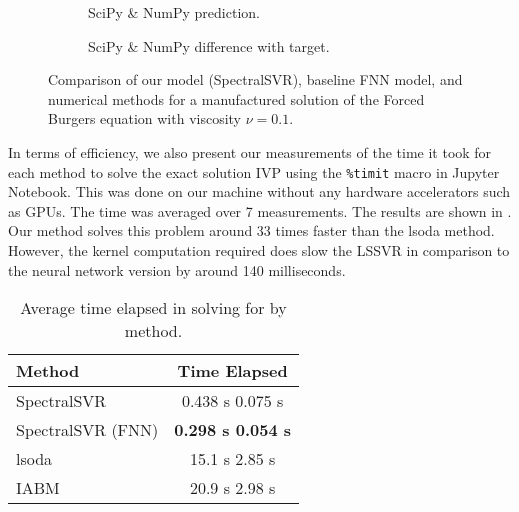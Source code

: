 \documentclass[preprint,12pt,times,authoryear]{elsarticle}
\begin{document}
\begin{figure}[H]
\begin{adjustwidth}{-0.05\linewidth}{-0.05\linewidth}
\begin{subfigure}{0.49\linewidth}
      \begin{adjustbox}{width=\linewidth}
        
      \end{adjustbox}
      \caption{SciPy \& NumPy prediction.}\label{fig:comp_spo_pred_0.1}
    \end{subfigure}
    \begin{subfigure}{0.49\linewidth}
      \begin{adjustbox}{width=\linewidth}
        
      \end{adjustbox}
      \caption{SciPy \& NumPy difference with target.}\label{fig:comp_spo_diff_0.1}
    \end{subfigure}
  \end{adjustwidth}
  \caption{Comparison of our model (SpectralSVR), baseline FNN model, and numerical methods for a manufactured solution of the Forced Burgers equation with viscosity \(\nu=0.1\).}\label{fig:comparison_burgers_0.1}
\end{figure}

In terms of efficiency, we also present our measurements of the time it took for each method to solve the exact solution IVP using the \verb|%timit| macro in Jupyter Notebook. This was done on our machine without any hardware accelerators such as GPUs. The time was averaged over 7 measurements. The results are shown in . Our method solves this problem around 33 times faster than the lsoda method. However, the kernel computation required does slow the LSSVR in comparison to the neural network version by around 140 milliseconds.
\begin{table}[H]
  \caption{Average time elapsed in solving for  by method.}\label{table:comparison_efficiency}
  \centering
  \begin{tabular}{lc}
    \toprule
    Method            & Time Elapsed               \\
    \midrule
    SpectralSVR       & 0.438 s \pm{} 0.075 s          \\
    SpectralSVR (FNN) & \textbf{0.298 s \pm{} 0.054 s} \\
    lsoda             & 15.1 s \pm{} 2.85 s            \\
    IABM              & 20.9 s \pm{} 2.98 s            \\
    \bottomrule
  \end{tabular}
\end{table}
\end{document}
